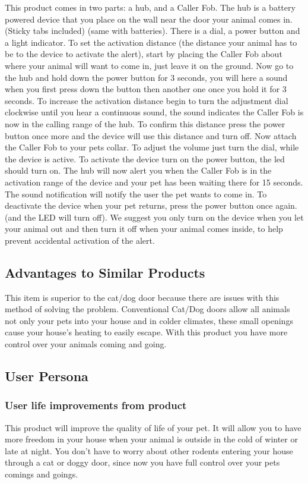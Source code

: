 \documentclass[titlepage]{article}
\begin{document}
    This product comes in two parts: a hub, and a Caller Fob. The hub
    is a battery powered device that you place on the wall near the door
    your animal comes in. (Sticky tabs included) (same with batteries).
    There is a dial, a power button and a light indicator.
    To set the activation distance (the distance your animal has to be
    to the device to activate the alert), start by placing the Caller
    Fob about where your animal will want to come in, just leave it on
    the ground. Now go to the hub and hold down the power button for 3
    seconds, you will here a sound when you first press down the button
    then another one once you hold it for 3 seconds. To increase the
    activation distance begin to turn the adjustment dial clockwise
    until you hear a continuous sound, the sound indicates the Caller
    Fob is now in the calling range of the hub.
    To confirm this distance press the power button once more and the
    device will use this distance and turn off. Now attach the Caller
    Fob to your pets collar.
    To adjust the volume just turn the dial, while the device is active.
    To activate the device turn on the power button, the led should turn
    on. The hub will now alert you when the Caller Fob is in the
    activation range of the device and your pet has been waiting there
    for 15 seconds. The sound notification will notify the user the pet
    wants to come in. To deactivate the device when your
    pet returns, press the power button once again. (and the LED will
    turn off). We suggest you only turn on the device when you let your
    animal out and then turn it off when your animal comes inside, to
    help prevent accidental activation of the alert.


    \subsection{Advantages to Similar Products}
    This item is superior to the cat/dog door because there are issues
    with this method of solving the problem. Conventional Cat/Dog doors
    allow all animals not only your pets into your house and in colder
    climates, these small openings cause your house’s heating to easily
    escape. With this product you have more control over your animals
    coming and going.

    \subsection{User Persona}
    \subsubsection{User life improvements from product}
    This product will improve the quality of life of your pet. It will
    allow you to have more freedom in your house when your animal is
    outside in the cold of winter or late at night.
    You don’t have to worry about other rodents entering your house
    through a cat or doggy door, since now you have full control over
    your pets comings and goings.
\end{document}
